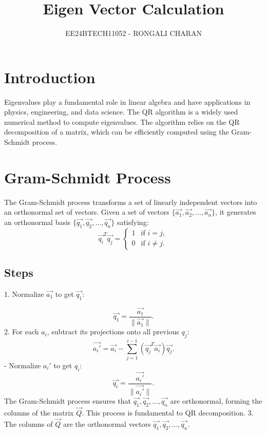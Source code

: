 \documentclass[journal,12pt,onecolumn]{IEEEtran}
\theoremstyle{remark}
\begin{document}

\vspace{3cm}
\title{Eigen Vector Calculation}
\author{EE24BTECH11052 - RONGALI CHARAN}
{\let\newpage\relax\maketitle}

\renewcommand{\thefigure}{\theenumi}
\renewcommand{\thetable}{\theenumi}
\setlength{\intextsep}{10pt} %


\renewcommand{\thetable}{\theenumi}
\section{Introduction}
Eigenvalues play a fundamental role in linear algebra and have applications in physics, engineering, and data science. The QR algorithm is a widely used numerical method to compute eigenvalues. The algorithm relies on the QR decomposition of a matrix, which can be efficiently computed using the Gram-Schmidt process.
\section{Gram-Schmidt Process}
The Gram-Schmidt process transforms a set of linearly independent vectors into an orthonormal set of vectors. Given a set of vectors $\{\vec{a_1},\vec{ a_2}, \dots, \vec{a_n}\}$, it generates an orthonormal basis $\{\vec{q_1},\vec{q_2}, \dots, \vec{q_n}\}$ satisfying:
$$
\vec{q_i}^T \vec{q_j} = 
\begin{cases} 
1 & \text{if } i = j, \\
0 & \text{if } i \neq j.
\end{cases}
$$
\subsection{Steps}
1. Normalize $\vec{a_1}$ to get $\vec{q_1}$:

$$\vec{q_1} = \frac{\vec{a_1}}{\|\vec{a_1}\|}.$$
2. For each $a_i$, subtract its projections onto all previous $q_j$:
   $$
   \vec{a_i'} = \vec{a_i} - \sum_{j=1}^{i-1} (\vec{q_j}^T \vec{a_i}) \vec{q_j}.
   $$
   - Normalize $a_i'$ to get $q_i$:
   $$
   \vec{q_i} = \frac{\vec{a_i'}}{\|\vec{a_i'}\|}.
   $$
   The Gram-Schmidt process ensures that $\vec{q_1}, \vec{q_2}, \dots, \vec{q_n}$ are orthonormal, forming the columns of the matrix $\vec{Q}$. This process is fundamental to QR decomposition.
3.  The columns of $\vec{Q}$ are the orthonormal vectors $ \vec{q_1}, \vec{q_2}, \dots, \vec{q_n} $.
\end{document}
